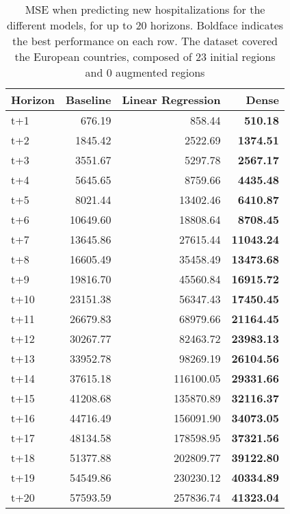 \begin{table}[H]
\centering
\caption{MSE when predicting new hospitalizations for the different models, for up to 20 horizons. Boldface indicates the best performance on each row. The dataset covered the European countries, composed of 23 initial regions and 0 augmented regions }
\label{tab:MSE_comparison}
\begin{tabular}{lrrr}
\toprule
Horizon &  Baseline &  Linear Regression &    Dense \\
\midrule
t+1  & 676.19  & 858.44  & \textbf{510.18}  \\
t+2  & 1845.42  & 2522.69  & \textbf{1374.51}  \\
t+3  & 3551.67  & 5297.78  & \textbf{2567.17}  \\
t+4  & 5645.65  & 8759.66  & \textbf{4435.48}  \\
t+5  & 8021.44  & 13402.46  & \textbf{6410.87}  \\
t+6  & 10649.60  & 18808.64  & \textbf{8708.45}  \\
t+7  & 13645.86  & 27615.44  & \textbf{11043.24}  \\
t+8  & 16605.49  & 35458.49  & \textbf{13473.68}  \\
t+9  & 19816.70  & 45560.84  & \textbf{16915.72}  \\
t+10  & 23151.38  & 56347.43  & \textbf{17450.45}  \\
t+11  & 26679.83  & 68979.66  & \textbf{21164.45}  \\
t+12  & 30267.77  & 82463.72  & \textbf{23983.13}  \\
t+13  & 33952.78  & 98269.19  & \textbf{26104.56}  \\
t+14  & 37615.18  & 116100.05  & \textbf{29331.66}  \\
t+15  & 41208.68  & 135870.89  & \textbf{32116.37}  \\
t+16  & 44716.49  & 156091.90  & \textbf{34073.05}  \\
t+17  & 48134.58  & 178598.95  & \textbf{37321.56}  \\
t+18  & 51377.88  & 202809.77  & \textbf{39122.80}  \\
t+19  & 54549.86  & 230230.12  & \textbf{40334.89}  \\
t+20  & 57593.59  & 257836.74  & \textbf{41323.04}  \\

\bottomrule
\end{tabular}
\end{table}
